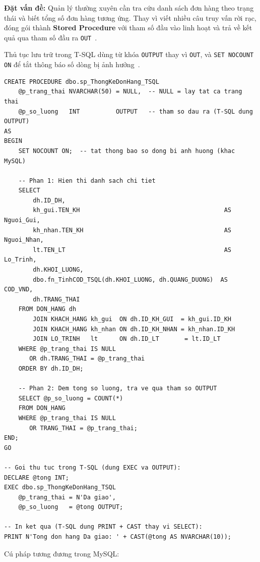 \documentclass[11pt]{report}
\begin{document}
\textbf{Đặt vấn đề:} Quản lý thường xuyên cần tra cứu danh sách đơn hàng theo trạng thái và biết tổng số đơn hàng tương ứng. Thay vì viết nhiều câu truy vấn rời rạc, đóng gói thành \textbf{Stored Procedure} với tham số đầu vào linh hoạt và trả về kết quả qua tham số đầu ra \texttt{OUT}~\cite{mysql80_sproc}.

Thủ tục lưu trữ trong T-SQL dùng từ khóa \texttt{OUTPUT} thay vì \texttt{OUT}, và \texttt{SET NOCOUNT ON} để tắt thông báo số dòng bị ảnh hưởng~\cite{mssql_tsql}.

\begin{verbatim}
CREATE PROCEDURE dbo.sp_ThongKeDonHang_TSQL
    @p_trang_thai NVARCHAR(50) = NULL,  -- NULL = lay tat ca trang thai
    @p_so_luong   INT          OUTPUT   -- tham so dau ra (T-SQL dung OUTPUT)
AS
BEGIN
    SET NOCOUNT ON;  -- tat thong bao so dong bi anh huong (khac MySQL)

    -- Phan 1: Hien thi danh sach chi tiet
    SELECT
        dh.ID_DH,
        kh_gui.TEN_KH                                        AS Nguoi_Gui,
        kh_nhan.TEN_KH                                       AS Nguoi_Nhan,
        lt.TEN_LT                                            AS Lo_Trinh,
        dh.KHOI_LUONG,
        dbo.fn_TinhCOD_TSQL(dh.KHOI_LUONG, dh.QUANG_DUONG)  AS COD_VND,
        dh.TRANG_THAI
    FROM DON_HANG dh
        JOIN KHACH_HANG kh_gui  ON dh.ID_KH_GUI  = kh_gui.ID_KH
        JOIN KHACH_HANG kh_nhan ON dh.ID_KH_NHAN = kh_nhan.ID_KH
        JOIN LO_TRINH   lt      ON dh.ID_LT       = lt.ID_LT
    WHERE @p_trang_thai IS NULL
       OR dh.TRANG_THAI = @p_trang_thai
    ORDER BY dh.ID_DH;

    -- Phan 2: Dem tong so luong, tra ve qua tham so OUTPUT
    SELECT @p_so_luong = COUNT(*)
    FROM DON_HANG
    WHERE @p_trang_thai IS NULL
       OR TRANG_THAI = @p_trang_thai;
END;
GO

-- Goi thu tuc trong T-SQL (dung EXEC va OUTPUT):
DECLARE @tong INT;
EXEC dbo.sp_ThongKeDonHang_TSQL
    @p_trang_thai = N'Da giao',
    @p_so_luong   = @tong OUTPUT;

-- In ket qua (T-SQL dung PRINT + CAST thay vi SELECT):
PRINT N'Tong don hang Da giao: ' + CAST(@tong AS NVARCHAR(10));
\end{verbatim}

Cú pháp tương đương trong MySQL:
\end{document}
